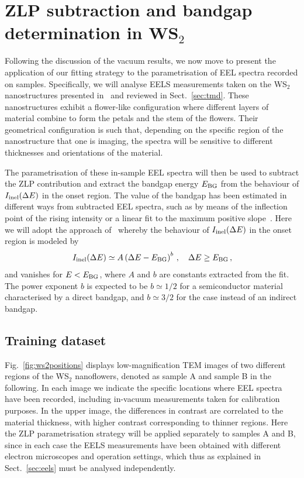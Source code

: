 \section{ZLP subtraction and bandgap determination in WS$_2$}
\label{sec:results_sample}

Following the discussion of the vacuum results, we now move
to present the application of our fitting strategy to the parametrisation
of EEL spectra recorded on samples.
%
Specifically, we will analyse EELS measurements taken on the WS$_2$ nanostructures
presented in~\cite{SabryaWS2} and reviewed in Sect.~\ref{sec:tmd}.
%
These nanostructures exhibit a flower-like configuration where different layers
of material combine to form the petals and the stem of the flowers.
%
Their geometrical configuration is such that, depending on the specific region
of the nanostructure that one is imaging, the spectra will be sensitive
to different thicknesses and orientations of the material.

The parametrisation of these in-sample EEL spectra will then be used
to subtract the ZLP contribution and extract the bandgap energy $E_{\rm BG}$ from
the behaviour of $I_{\rm inel}(\Delta E)$ in the onset region.
%
The value of the bandgap  has been estimated in different ways
from subtracted EEL spectra, such as by means of the inflection point of the rising intensity or
a linear fit to the maximum positive slope~\cite{Schamm:2003}.
%
Here we will adopt the approach of~\cite{Rafferty:2000} whereby the behaviour
of $I_{\rm inel}(\Delta E)$ in the onset region is  modeled by
\begin{equation}
  \label{eq:I1}
    I_{\rm inel}(\Delta E) \simeq  A \left( \Delta E-E_{\rm BG} \right)^{b} \, , \quad \Delta E \ge E_{\rm BG} \, ,
\end{equation}
and vanishes for $E < E_{\rm BG}$, where $A$ and $b$ are constants extracted from the fit.
%
The power exponent $b$ is expected to be $b\simeq 1/2$ for a semiconductor material characterised
by a direct bandgap, and $b\simeq 3/2$ for the case instead of an indirect bandgap.

\subsection{Training dataset}
%
Fig.~\ref{fig:ws2positions} displays
low-magnification TEM images of two different regions of
the WS$_2$ nanoflowers, denoted as sample A and sample B in the following.
%
In each image we indicate the specific locations where
EEL spectra have been recorded, including in-vacuum measurements taken
for calibration purposes.
%
In the upper image, the differences in contrast are correlated to the material
thickness, with higher contrast corresponding to thinner regions.
%
Here the ZLP parametrisation strategy will be applied separately
to samples A and B, since in each case the EELS measurements have
been obtained with different electron microscopes and
operation settings, which thus as explained in Sect.~\ref{sec:eels}
must be analysed independently.

